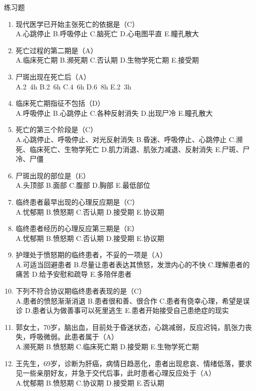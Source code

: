 \documentclass[11pt, a4paper]{ctexart}
\begin{document}
\begin{examplebox}{练习题}
\begin{enumerate}
    \item 现代医学已开始主张死亡的依据是（C）\\
    A.心跳停止 \quad B.呼吸停止 \quad C.脑死亡 \quad D.心电图平直 \quad E.瞳孔散大
    \item 死亡过程的第二期是（A）\\
    A.临床死亡期 \quad B.濒死期 \quad C.否认期 \quad D.生物学死亡期 \quad E.接受期
    \item 尸斑出现在死亡后（A）\\
    A.2~4h \quad B.2~6h \quad C.4~6h \quad D.6~8h \quad E.2~3h
    \item 临床死亡期指征不包括（D）\\
    A.呼吸停止 \quad B.心跳停止 \quad C.各种反射消失 \quad D.出现尸冷 \quad E.瞳孔散大
    \item 死亡的第三个阶段是（C）\\
    A.心跳停止、呼吸停止、对光反射消失 \quad B.昏迷、呼吸停止、心跳停止 \quad C.濒死、临床死亡、生物学死亡 \quad D.肌力消退、肌张力减退、反射消失 \quad E.尸斑、尸冷、尸僵
    \item 尸斑出现的部位是（E）\\
    A.头顶部 \quad B.面部 \quad C.腹部 \quad D.胸部 \quad E.最低部位
    \item 临终患者最早出现的心理反应期是（C）\\
    A.忧郁期 \quad B.愤怒期 \quad C.否认期 \quad D.接受期 \quad E.协议期
    \item 临终患者经历的心理反应第三期是（E）\\
    A.忧郁期 \quad B.愤怒期 \quad C.否认期 \quad D.接受期 \quad E.协议期
    \item 护理处于愤怒期的临终患者，不妥的一项是（A）\\
    A.可适当回避患者 \quad B.尽量让患者表达其愤怒，发泄内心的不快 \quad C.理解患者的痛苦 \quad D.给予安慰和疏导 \quad E.多陪伴患者
    \item 下列不符合协议期临终患者表现的是（C）\\
    A.患者的愤怒渐渐消退 \quad B.患者很和善、很合作 \quad C.患者有侥幸心理，希望是误诊 \quad D.患者认为做善事可以死里逃生 \quad E.患者开始接受自己患绝症的现实
    \item 郭女士，70岁，脑出血，目前处于昏迷状态，心跳减弱，反应迟钝，肌张力丧失，呼吸微弱。此患者属于（A）\\
    A.濒死期 \quad B.愤怒期 \quad C.临床死亡期 \quad D.接受期 \quad E.生物学死亡期
    \item 王先生，69岁，诊断为肝癌，病情日趋恶化，患者出现悲哀、情绪低落，要求见一些亲朋好友，并急于交代后事，此时患者心理反应处于（A）\\
    A.忧郁期 \quad B.愤怒期 \quad C.协议期 \quad D.接受期 \quad E.否认期
\end{enumerate}
\end{examplebox}
\end{document}
